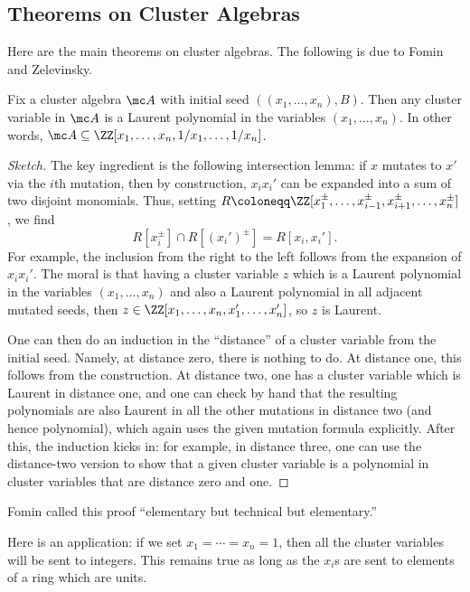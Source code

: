 \documentclass[../notes.tex]{subfiles}
\begin{document}
\subsection{Theorems on Cluster Algebras}
Here are the main theorems on cluster algebras. The following is due to Fomin and Zelevinsky.
\begin{theorem} \label{thm:laurent}
	Fix a cluster algebra $\mc A$ with initial seed $((x_1,\ldots,x_n),B)$. Then any cluster variable in $\mc A$ is a Laurent polynomial in the variables $(x_1,\ldots,x_n)$. In other words, $\mc A\subseteq\ZZ[x_1,\ldots,x_n,1/x_1,\ldots,1/x_n]$.
\end{theorem}
\begin{proof}[Sketch]
	The key ingredient is the following intersection lemma: if $x$ mutates to $x'$ via the $i$th mutation, then by construction, $x_ix_i'$ can be expanded into a sum of two disjoint monomials. Thus, setting $R\coloneqq\ZZ[x_1^\pm,\ldots,x_{i-1}^\pm,x_{i+1}^\pm,\ldots,x_n^\pm]$, we find
	\[R\left[x_i^\pm\right]\cap R\left[(x_i')^\pm\right]=R[x_i,x_i'].\]
	For example, the inclusion from the right to the left follows from the expansion of $x_ix_i'$. The moral is that having a cluster variable $z$ which is a Laurent polynomial in the variables $(x_1,\ldots,x_n)$ and also a Laurent polynomial in all adjacent mutated seeds, then $z\in\ZZ[x_1,\ldots,x_n,x_1',\ldots,x_n']$, so $z$ is Laurent.
	
	One can then do an induction in the ``distance'' of a cluster variable from the initial seed. Namely, at distance zero, there is nothing to do. At distance one, this follows from the construction. At distance two, one has a cluster variable which is Laurent in distance one, and one can check by hand that the resulting polynomials are also Laurent in all the other mutations in distance two (and hence polynomial), which again uses the given mutation formula explicitly. After this, the induction kicks in: for example, in distance three, one can use the distance-two version to show that a given cluster variable is a polynomial in cluster variables that are distance zero and one.
\end{proof}
\begin{remark}
	Fomin called this proof ``elementary but technical but elementary.''
\end{remark}
\begin{remark}
	Here is an application: if we set $x_1=\cdots=x_n=1$, then all the cluster variables will be sent to integers. This remains true as long as the $x_i$s are sent to elements of a ring which are units.
\end{remark}
\end{document}

